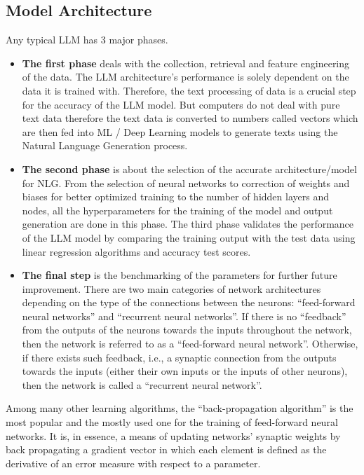 \subsection{Model Architecture}

Any typical LLM has 3 major phases.
\begin{itemize}
      \item \textbf{The first phase} deals with the collection, retrieval and feature engineering of the data.
            The LLM architecture’s performance is solely dependent on the data it is trained with. Therefore, the text processing of data is a crucial step for the accuracy of the LLM model. But computers do not deal with pure text data therefore the text data is converted to numbers called vectors which are then fed into ML / Deep Learning models to generate texts using the Natural Language Generation process.
      \item \textbf{The second phase} is about the selection of the accurate architecture/model for NLG.
            From the selection of neural networks to correction of weights and biases for better optimized training to the number of hidden layers and nodes, all the hyperparameters for the training of the model and output generation are done in this phase. The third phase validates the performance of the LLM model by comparing the training output with the test data using linear regression algorithms and accuracy test scores.
      \item \textbf{The final step} is the benchmarking of the parameters for further future improvement. There are two main categories of network architectures depending on the type of the connections between the neurons: “feed-forward neural networks” and “recurrent neural networks”. If there is no “feedback” from the outputs of the neurons towards the inputs throughout the network, then the network is referred to as a “feed-forward neural network”. Otherwise, if there exists such feedback, i.e., a synaptic connection from the outputs towards the inputs (either their own inputs or the inputs of other neurons), then the network is called a “recurrent neural network”.
\end{itemize}

\cite{ResearchGateNN:1}Among many other learning algorithms, the “back-propagation algorithm” is the most popular and the mostly used one for the training of feed-forward neural networks. It is, in essence, a means of updating networks’ synaptic weights by back propagating a gradient vector in which each element is defined as the derivative of an error measure with respect to a parameter.

